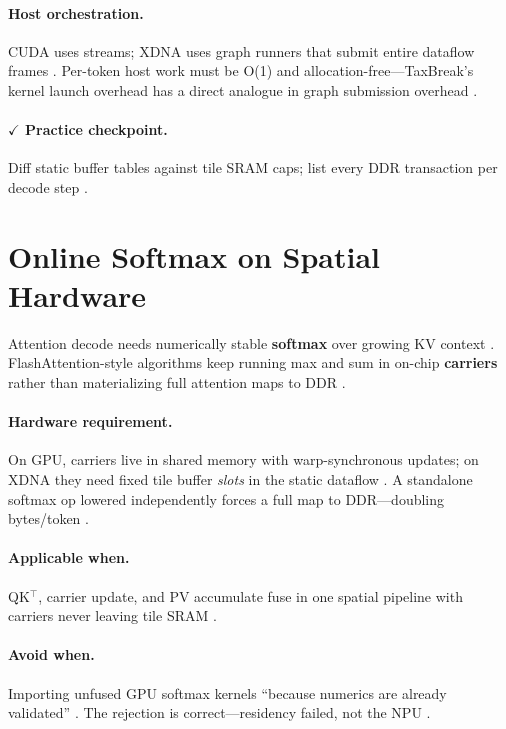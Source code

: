 \paragraph{Host orchestration.}
CUDA uses streams; XDNA uses graph runners that submit entire dataflow frames \citep{nvidia2024cudagraphs,amd2024xdna,yirage2026}.
Per-token host work must be O(1) and allocation-free---TaxBreak's kernel launch overhead has a direct analogue in graph submission overhead \citep{taxbreak2026,memoryfloor2026}.

\paragraph{$\checkmark$ Practice checkpoint.}
Diff static buffer tables against tile SRAM caps; list every DDR transaction per decode step \citep{memoryfloor2026,amd2024aie}.

\section{Online Softmax on Spatial Hardware}
\label{sec:ch05_online_softmax_hw}

Attention decode needs numerically stable \textbf{softmax} over growing KV context \citep{dao2022flashattention,dao2023flashdecoding}.
FlashAttention-style algorithms keep running max and sum in on-chip \textbf{carriers} rather than materializing full attention maps to DDR \citep{memoryfloor2026}.

\paragraph{Hardware requirement.}
On GPU, carriers live in shared memory with warp-synchronous updates; on XDNA they need fixed tile buffer \emph{slots} in the static dataflow \citep{amd2024aie,yirage2026}.
A standalone softmax op lowered independently forces a full map to DDR---doubling bytes/token \citep{taxbreak2026,memoryfloor2026}.

\paragraph{Applicable when.}
QK$^\top$, carrier update, and PV accumulate fuse in one spatial pipeline with carriers never leaving tile SRAM \citep{dao2022flashattention,semianalysis2024tma}.

\paragraph{Avoid when.}
Importing unfused GPU softmax kernels ``because numerics are already validated'' \citep{amd2024xdna,yirage2026}.
The rejection is correct---residency failed, not the NPU \citep{patel2025llminference}.

